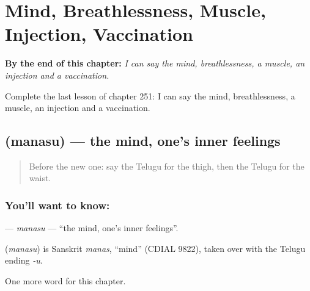 
\chapter{Mind, Breathlessness, Muscle, Injection, Vaccination}
\label{ch:te-mind-breathlessness-muscle-injection-vaccination}

\begin{chapteropening}
\textbf{By the end of this chapter:} \emph{I can say the mind, breathlessness, a muscle, an injection and a vaccination.}

Complete the last lesson of chapter 251: I can say the mind, breathlessness, a muscle, an injection and a vaccination.
\end{chapteropening}

\section[\texorpdfstring{\te{మనసు} (manasu)}{మనసు (manasu)}]{ (manasu) — the mind, one's inner feelings}

\label{lesson:TE-C251-manasu}



\begin{quote}
Before the new one: say the Telugu for the thigh, then the Telugu for the waist.
\end{quote}

\subsection*{You'll want to know: }
\textbf{} — \emph{manasu} — \textquotedblleft{}the mind, one's inner feelings\textquotedblright{}.

\begin{cousinweb}
\textbf{} (\emph{manasu}) is Sanskrit \emph{manas}, \textquotedblleft{}mind\textquotedblright{} (CDIAL 9822), taken over with the Telugu ending \emph{-u}.
\end{cousinweb}

\begin{grammarlens}[title={What you've built}]
One more word for this chapter.
\end{grammarlens}

